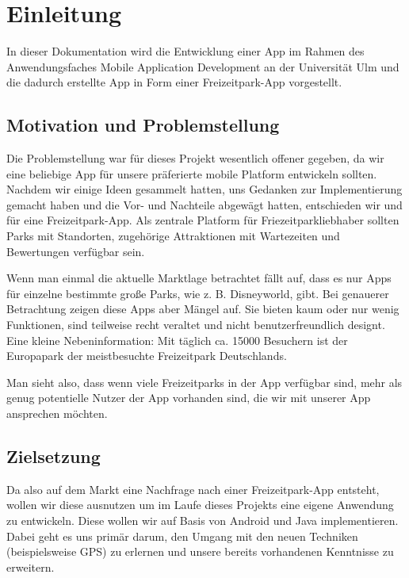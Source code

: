 \chapter{Einleitung}
\label{cha:einleitung}

In dieser Dokumentation wird die Entwicklung einer App im Rahmen des Anwendungsfaches Mobile Application Development an der Universität Ulm und die dadurch erstellte App in Form einer Freizeitpark-App vorgestellt.

\section{Motivation und Problemstellung}
\label{sec:einleitung:problemstellung}

Die Problemstellung war für dieses Projekt wesentlich offener gegeben, da wir eine beliebige App für unsere präferierte mobile Platform entwickeln sollten. Nachdem wir einige Ideen gesammelt hatten, uns Gedanken zur Implementierung gemacht haben und die Vor- und Nachteile abgewägt hatten, entschieden wir und für eine Freizeitpark-App. Als zentrale Platform für Friezeitparkliebhaber sollten Parks mit Standorten, zugehörige Attraktionen mit Wartezeiten und Bewertungen verfügbar sein. 

Wenn man einmal die aktuelle Marktlage betrachtet fällt auf, dass es nur Apps für einzelne bestimmte große Parks, wie z. B. Disneyworld, gibt. Bei genauerer Betrachtung zeigen diese Apps aber Mängel auf. Sie bieten kaum oder nur wenig Funktionen, sind teilweise recht veraltet und nicht benutzerfreundlich designt. \\

Eine kleine Nebeninformation: Mit täglich ca. 15000 Besuchern ist der Europapark der meistbesuchte Freizeitpark Deutschlands. 

Man sieht also, dass wenn viele Freizeitparks in der App verfügbar sind, mehr als genug potentielle Nutzer der App vorhanden sind, die wir mit unserer App ansprechen möchten.


\section{Zielsetzung}
\label{sec:einleitung:zielsetzung}

Da also auf dem Markt eine Nachfrage nach einer Freizeitpark-App entsteht, wollen wir diese ausnutzen um im Laufe dieses Projekts eine eigene Anwendung zu entwickeln. Diese wollen wir auf Basis von Android und Java implementieren. Dabei geht es uns primär darum, den Umgang mit den neuen Techniken (beispielsweise GPS) zu erlernen und unsere bereits vorhandenen Kenntnisse zu erweitern. 


